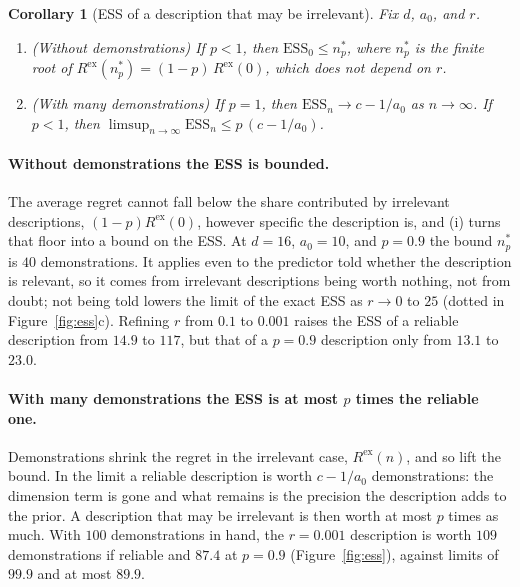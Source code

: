 \documentclass{article}
\newtheorem{corollary}[theorem]{Corollary}
\newcommand{\ess}{\mathrm{ESS}}
\begin{document}
\begin{corollary}[ESS of a description that may be irrelevant]\label{cor:ess}
Fix $d$, $a_0$, and $r$.
\begin{enumerate}
    \item[(i)] (Without demonstrations) If $p < 1$, then $\ess_0 \le n^*_p$, where $n^*_p$ is the finite root of $R^{\mathrm{ex}}(n^*_p) = (1-p)\,R^{\mathrm{ex}}(0)$, which does not depend on $r$.
    \item[(ii)] (With many demonstrations) If $p = 1$, then $\ess_n \to c - 1/a_0$ as $n \to \infty$. If $p < 1$, then $\limsup_{n \to \infty} \ess_n \le p\,(c - 1/a_0)$.
\end{enumerate}
\end{corollary}

\paragraph{Without demonstrations the ESS is bounded.} The average regret cannot fall below the share contributed by irrelevant descriptions, $(1-p)R^{\mathrm{ex}}(0)$, however specific the description is, and (i) turns that floor into a bound on the ESS. At $d = 16$, $a_0 = 10$, and $p = 0.9$ the bound $n^*_p$ is $40$ demonstrations. It applies even to the predictor told whether the description is relevant, so it comes from irrelevant descriptions being worth nothing, not from doubt; not being told lowers the limit of the exact ESS as $r \to 0$ to $25$ (dotted in Figure~\ref{fig:ess}c). Refining $r$ from $0.1$ to $0.001$ raises the ESS of a reliable description from $14.9$ to $117$, but that of a $p = 0.9$ description only from $13.1$ to $23.0$.

\paragraph{With many demonstrations the ESS is at most $p$ times the reliable one.} Demonstrations shrink the regret in the irrelevant case, $R^{\mathrm{ex}}(n)$, and so lift the bound. In the limit a reliable description is worth $c - 1/a_0$ demonstrations: the dimension term is gone and what remains is the precision the description adds to the prior. A description that may be irrelevant is then worth at most $p$ times as much. With $100$ demonstrations in hand, the $r = 0.001$ description is worth $109$ demonstrations if reliable and $87.4$ at $p = 0.9$ (Figure~\ref{fig:ess}), against limits of $99.9$ and at most $89.9$.
\end{document}
